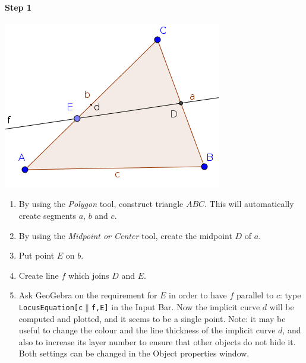 \documentclass{article}
\begin{document}
\paragraph{Step 1}
\begin{center}
\includegraphics[scale=0.5]{classroom1}
\end{center}
\begin{enumerate}
    \item By using the \textit{Polygon} tool, construct triangle $ABC$. This will automatically create segments $a$, $b$ and $c$.
    \item By using the \textit{Midpoint or Center} tool, create the midpoint $D$ of $a$.
    \item Put point $E$ on $b$.
    \item Create line $f$ which joins $D$ and $E$.
    \item Ask GeoGebra on the requirement for $E$ in order to have $f$ parallel to $c$: type \texttt{LocusEquation[c$\parallel$f,E]} in the Input Bar. Now the implicit curve $d$ will be computed and plotted, and it seems to be a single point. Note: it may be useful to change the colour and the line thickness of the implicit curve $d$, and also to increase its layer number to ensure that other objects do not hide it. Both settings can be changed in the Object properties window.
\end{enumerate}
\end{document}
